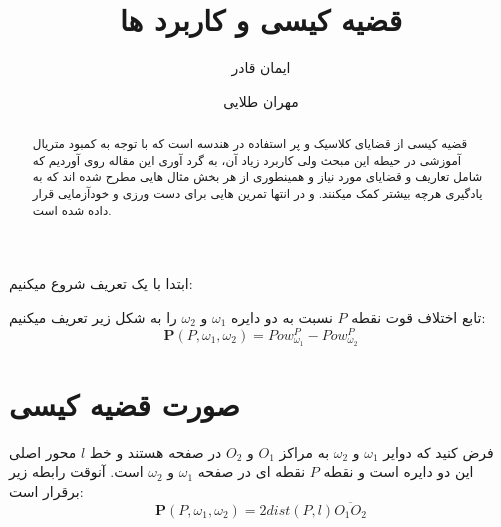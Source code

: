 \documentclass{article}
\author{ایمان قادر \and  مهران طلایی }
\title{قضیه کیسی و کاربرد ها}
\begin{document}
\maketitle

\begin{abstract}
قضیه کیسی از قضایای کلاسیک و پر استفاده در هندسه است که با توجه به کمبود متریال آموزشی در حیطه این مبحث ولی کاربرد زیاد آن، به گرد آوری این مقاله روی آوردیم که شامل تعاریف و قضایای مورد نیاز و همینطوری از هر بخش مثال هایی مطرح شده اند که به یادگیری هرچه بیشتر کمک میکنند. و در انتها تمرین هایی برای دست ورزی و خودآزمایی قرار داده شده است.
\end{abstract}


ابتدا با یک تعریف شروع میکنیم:
\begin{defi}{}{}
تابع اختلاف قوت نقطه $P$ نسبت به دو دایره $\omega_1$ و $\omega_2$ را به شکل زیر تعریف میکنیم:
\[\mathbf{P}(P,\omega_1,\omega_2)=Pow_{\omega_1}^P -Pow_{\omega_2}^P\]
\end{defi}

\section{صورت قضیه کیسی}

\begin{theo}{}{}
فرض کنید که دوایر $\omega_1$ و $\omega_2$ به مراکز $O_1$ و $O_2$ در صفحه هستند و خط $l$ محور اصلی این دو دایره است و نقطه $P$ نقطه ای در صفحه $\omega_1$ و $\omega_2$ است. آنوقت رابطه زیر برقرار است:
\[\mathbf{P}(P,\omega_1,\omega_2)=2dist(P,l) \overline{O_1O_2} \]
\end{theo}
\end{document}
